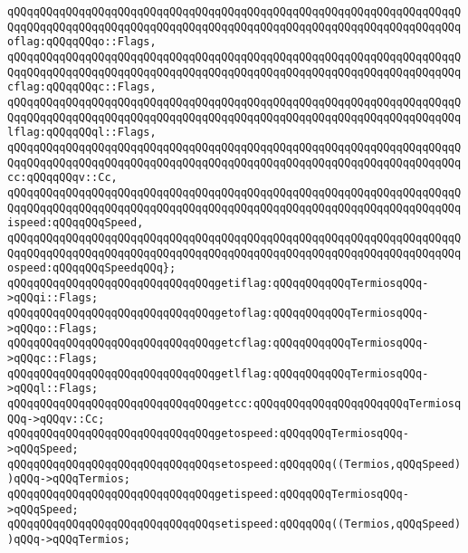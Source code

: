 \verb|qQQqqQQqqQQqqQQqqQQqqQQqqQQqqQQqqQQqqQQqqQQqqQQqqQQqqQQqqQQqqQQqqQQqqQQqqQQqqQQqqQQqqQQqqQQqqQQqqQQqqQQqqQQqqQQqqQQqqQQqqQQqqQQqqQQqqQQqqQQqoflag:qQQqqQQqo::Flags,|\newline
\verb|qQQqqQQqqQQqqQQqqQQqqQQqqQQqqQQqqQQqqQQqqQQqqQQqqQQqqQQqqQQqqQQqqQQqqQQqqQQqqQQqqQQqqQQqqQQqqQQqqQQqqQQqqQQqqQQqqQQqqQQqqQQqqQQqqQQqqQQqqQQqcflag:qQQqqQQqc::Flags,|\newline
\verb|qQQqqQQqqQQqqQQqqQQqqQQqqQQqqQQqqQQqqQQqqQQqqQQqqQQqqQQqqQQqqQQqqQQqqQQqqQQqqQQqqQQqqQQqqQQqqQQqqQQqqQQqqQQqqQQqqQQqqQQqqQQqqQQqqQQqqQQqqQQqlflag:qQQqqQQql::Flags,|\newline
\verb|qQQqqQQqqQQqqQQqqQQqqQQqqQQqqQQqqQQqqQQqqQQqqQQqqQQqqQQqqQQqqQQqqQQqqQQqqQQqqQQqqQQqqQQqqQQqqQQqqQQqqQQqqQQqqQQqqQQqqQQqqQQqqQQqqQQqqQQqqQQqcc:qQQqqQQqv::Cc,|\newline
\verb|qQQqqQQqqQQqqQQqqQQqqQQqqQQqqQQqqQQqqQQqqQQqqQQqqQQqqQQqqQQqqQQqqQQqqQQqqQQqqQQqqQQqqQQqqQQqqQQqqQQqqQQqqQQqqQQqqQQqqQQqqQQqqQQqqQQqqQQqqQQqispeed:qQQqqQQqSpeed,|\newline
\verb|qQQqqQQqqQQqqQQqqQQqqQQqqQQqqQQqqQQqqQQqqQQqqQQqqQQqqQQqqQQqqQQqqQQqqQQqqQQqqQQqqQQqqQQqqQQqqQQqqQQqqQQqqQQqqQQqqQQqqQQqqQQqqQQqqQQqqQQqqQQqospeed:qQQqqQQqSpeedqQQq};|\newline
\newline
\verb|qQQqqQQqqQQqqQQqqQQqqQQqqQQqqQQqgetiflag:qQQqqQQqqQQqTermiosqQQq->qQQqi::Flags;|\newline
\verb|qQQqqQQqqQQqqQQqqQQqqQQqqQQqqQQqgetoflag:qQQqqQQqqQQqTermiosqQQq->qQQqo::Flags;|\newline
\verb|qQQqqQQqqQQqqQQqqQQqqQQqqQQqqQQqgetcflag:qQQqqQQqqQQqTermiosqQQq->qQQqc::Flags;|\newline
\verb|qQQqqQQqqQQqqQQqqQQqqQQqqQQqqQQqgetlflag:qQQqqQQqqQQqTermiosqQQq->qQQql::Flags;|\newline
\verb|qQQqqQQqqQQqqQQqqQQqqQQqqQQqqQQqgetcc:qQQqqQQqqQQqqQQqqQQqqQQqTermiosqQQq->qQQqv::Cc;|\newline
\newline
\verb|qQQqqQQqqQQqqQQqqQQqqQQqqQQqqQQqgetospeed:qQQqqQQqTermiosqQQq->qQQqSpeed;|\newline
\verb|qQQqqQQqqQQqqQQqqQQqqQQqqQQqqQQqsetospeed:qQQqqQQq((Termios,qQQqSpeed))qQQq->qQQqTermios;|\newline
\verb|qQQqqQQqqQQqqQQqqQQqqQQqqQQqqQQqgetispeed:qQQqqQQqTermiosqQQq->qQQqSpeed;|\newline
\verb|qQQqqQQqqQQqqQQqqQQqqQQqqQQqqQQqsetispeed:qQQqqQQq((Termios,qQQqSpeed))qQQq->qQQqTermios;|\newline
